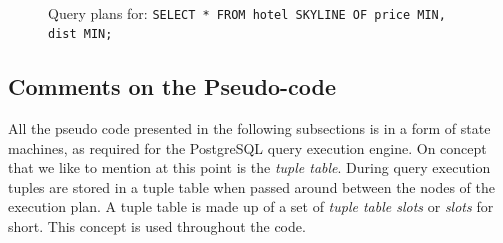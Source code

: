 \begin{figure}[htbp]
{\begin{minipage}[b]{\onecolumnwidth}
\end{minipage}
\label{fig:qp-sfs-ef}%
}%
%
\\
%
%
\hspace{\columnsep}%
%
%
\caption{Query plans for: 
\texttt{SELECT * FROM hotel SKYLINE OF price MIN, dist MIN;}}%
\end{figure}


\subsection{Comments on the Pseudo-code}
All the pseudo code presented in the following subsections is in a
form of state machines, as required for the PostgreSQL query execution
engine.  On concept that we like to mention at this point is the
\emph{tuple table}.  During query execution tuples are stored in a
tuple table when passed around between the nodes of the execution plan.
A tuple table is made up of a set of \emph{tuple table slots} or \emph{slots}
for short.  This concept is used throughout the code.


